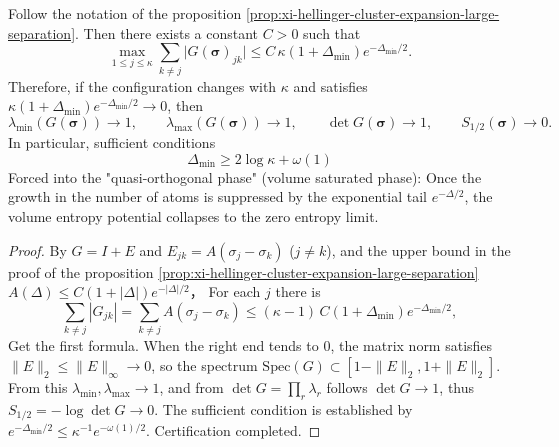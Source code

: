 \begin{corollary}\label{cor:xi-hellinger-quasi-orthogonal-phase}
Follow the notation of the proposition \ref{prop:xi-hellinger-cluster-expansion-large-separation}.
Then there exists a constant \(C>0\) such that
\[
\max_{1\le j\le \kappa}\sum_{k\neq j}\bigl|G(\boldsymbol{\sigma})_{jk}\bigr|
\le C\,\kappa(1+\Delta_{\min})e^{-\Delta_{\min}/2}.
\]
Therefore, if the configuration changes with \(\kappa\) and satisfies \(\kappa(1+\Delta_{\min})e^{-\Delta_{\min}/2}\to 0\), then
\[
\lambda_{\min}(G(\boldsymbol{\sigma}))\to 1,\qquad
\lambda_{\max}(G(\boldsymbol{\sigma}))\to 1,\qquad
\det G(\boldsymbol{\sigma})\to 1,\qquad
S_{1/2}(\boldsymbol{\sigma})\to 0.
\]
In particular, sufficient conditions
\[
\Delta_{\min}\ge 2\log\kappa+\omega(1)
\]
Forced into the "quasi-orthogonal phase" (volume saturated phase): Once the growth in the number of atoms is suppressed by the exponential tail \(e^{-\Delta/2}\), the volume entropy potential collapses to the zero entropy limit.
\end{corollary}
\begin{proof}
By \(G=I+E\) and \(E_{jk}=A(\sigma_j-\sigma_k)\) (\(j\neq k\)), and the upper bound in the proof of the proposition \ref{prop:xi-hellinger-cluster-expansion-large-separation}
\(
A(\Delta)\le C(1+|\Delta|)e^{-|\Delta|/2}
\)，
For each \(j\) there is
\[
\sum_{k\neq j}|G_{jk}|=\sum_{k\neq j}A(\sigma_j-\sigma_k)\le (\kappa-1)\,C(1+\Delta_{\min})e^{-\Delta_{\min}/2},
\]
Get the first formula.
When the right end tends to \(0\), the matrix norm satisfies \(\|E\|_2\le \|E\|_\infty\to 0\), so the spectrum \(\mathrm{Spec}(G)\subset [1-\|E\|_2,1+\|E\|_2]\).
From this \(\lambda_{\min},\lambda_{\max}\to 1\), and from \(\det G=\prod_r\lambda_r\) follows \(\det G\to 1\), thus \(S_{1/2}=-\log\det G\to 0\).
The sufficient condition is established by \(e^{-\Delta_{\min}/2}\le \kappa^{-1}e^{-\omega(1)/2}\). Certification completed.
\end{proof}

